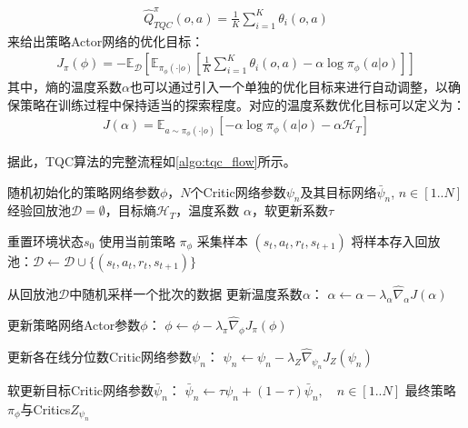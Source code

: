 \begin{align}
    \hat{Q}_{TQC}^{\pi}(o,a) = \frac{1}{K} \sum_{i=1}^K \theta_{i}(o,a)
\end{align}
来给出策略Actor网络的优化目标：
\begin{align}\label{eq:actor_loss}
    J_{\pi}(\phi) = -\mathbb{E}_{\mathcal{D}} \left[ \mathbb{E}_{\pi_\phi(\cdot|o)} \left[ \frac{1}{K} \sum_{i=1}^K \theta_{i}(o,a) - \alpha \log \pi_\phi(a|o) \right] \right]
\end{align}
其中，熵的温度系数$\alpha$也可以通过引入一个单独的优化目标来进行自动调整，以确保策略在训练过程中保持适当的探索程度。对应的温度系数优化目标可以定义为：
\begin{align}\label{eq:alpha_loss}
    J(\alpha) = \mathbb{E}_{a \sim \pi_\phi(\cdot|o)}\left[ -\alpha \log \pi_\phi(a|o) - \alpha \mathcal{H}_T \right]
\end{align}

据此，TQC算法的完整流程如\cref{algo:tqc_flow}所示。

\begin{algorithm}
  \caption{TQC 算法流程}\label{algo:tqc_flow}
  \begin{algorithmic}[1]
    \Require 随机初始化的策略网络参数$\phi$，$N$个Critic网络参数$\psi_n$及其目标网络$\bar{\psi}_n$, $n \in [1..N]$
    \Require 经验回放池$\mathcal{D} = \emptyset$，目标熵$\mathcal{H}_T$，温度系数 $\alpha$，软更新系数$\tau$

        \State 重置环境状态$s_0$
            \State 使用当前策略 $\pi_\phi$ 采集样本 $(s_t, a_t, r_t, s_{t+1})$
            \State 将样本存入回放池：$\mathcal{D} \leftarrow \mathcal{D} \cup \{(s_t, a_t, r_t, s_{t+1})\}$
        \EndFor
        
            \State 从回放池$\mathcal{D}$中随机采样一个批次的数据
            \State 更新温度系数$\alpha$：
            \State \quad $\alpha \leftarrow \alpha - \lambda_\alpha \hat{\nabla}_\alpha J(\alpha)$ 
            
            \State 更新策略网络Actor参数$\phi$：
            \State \quad $\phi \leftarrow \phi - \lambda_\pi \hat{\nabla}_\phi J_\pi(\phi)$ 
            
            \State 更新各在线分位数Critic网络参数$\psi_n$：
                \State $\psi_n \leftarrow \psi_n - \lambda_Z \hat{\nabla}_{\psi_n} J_Z(\psi_n)$ 
            \EndFor
            
            \State 软更新目标Critic网络参数$\bar{\psi}_n$：
            \State \quad $\bar{\psi}_n \leftarrow \tau \psi_n + (1 - \tau) \bar{\psi}_n, \quad n \in [1..N]$
        \EndFor
    \EndFor
    \State \Return 最终策略$\pi_\phi$与Critics$Z_{\psi_n}$
  \end{algorithmic}
\end{algorithm}

